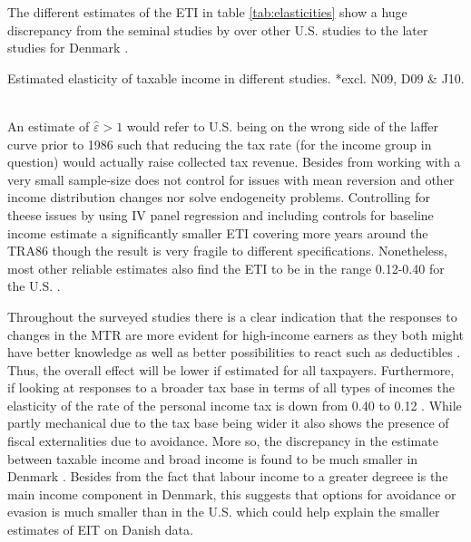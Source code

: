 \label{sec:results}
The different estimates of the ETI in table \ref{tab:elasticities} show a huge discrepancy from the seminal studies by \citet{feldstein1995effect} over other U.S. studies \citep{gruber2002elasticity} to the later studies for Denmark \citep{chetty2011adjustment,kleven2014estimating,kreiner2016tax}.
\begin{table}[h]
  \centering
  \footnotesize
    
  \caption{Estimated elasticity of taxable income in different studies. *excl. N09, D09 \& J10.}
  \label{tab:elasticities}
\end{table}
\\
An estimate of $\hat{\varepsilon}>1$ would refer to U.S. being on the wrong side of the laffer curve prior to 1986 such that reducing the tax rate (for the income group in question) would actually raise collected tax revenue. Besides from working with a very small sample-size \citet{feldstein1995effect} does not control for issues with mean reversion and other income distribution changes nor solve endogeneity problems. Controlling for theese issues by using IV panel regression and including controls for baseline income \citet{gruber2002elasticity} estimate a significantly smaller ETI covering more years around the TRA86 though the result is very fragile to different specifications. Nonetheless, most other reliable estimates also find the ETI to be in the range 0.12-0.40 for the U.S. \citep{saez2012elasticity}.

Throughout the surveyed studies there is a clear indication that the responses to changes in the MTR are more evident for high-income earners as they both might have better knowledge as well as better possibilities to react such as deductibles \citep{saez2012elasticity}. Thus, the overall effect will be lower if estimated for all taxpayers. Furthermore, if looking at responses to a broader tax base in terms of all types of incomes the elasticity of the rate of the personal income tax is down from 0.40 to 0.12 \citep{gruber2002elasticity}. While partly mechanical due to the tax base being wider it also shows the presence of fiscal externalities due to avoidance. More so, the discrepancy in the estimate between taxable income and broad income is found to be much smaller in Denmark \citep{kleven2014estimating}. Besides from the fact that labour income to a greater degreee is the main income component in Denmark, this suggests that options for avoidance or evasion is much smaller than in the U.S. which could help explain the smaller estimates of EIT on Danish data.

